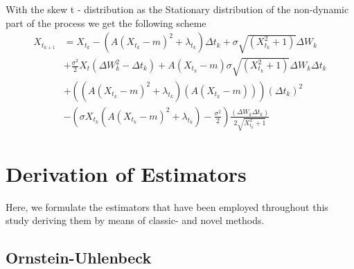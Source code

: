 With the skew t - distribution as the Stationary distribution of the non-dynamic part of the process we get the following scheme
\begin{align}
    X_{t_{k + 1}} &= X_{t_k} - \left(A(X_{t_k} - m)^2 + \lambda_{t_k}\right) \Delta t_k + \sigma \sqrt{\left(X_{t_k}^2 + 1\right)} \Delta W_{k} \nonumber\\
    &+ \frac{\sigma^2}{2}X_t \left(\Delta W_{k}^2 - \Delta t_k\right) + A\left(X_{t_k} - m \right)\sigma\sqrt{\left(X_{t_k}^2 + 1\right)}\Delta W_{k}\Delta t_k \nonumber\\
    &+ \left(\left(A\left(X_{t_k} - m \right)^2+\lambda_{t_k}\right)\left(A\left(X_{t_k} - m \right)\right)\right)\left(\Delta t_k\right)^2 \nonumber\\
    &-\left(\sigma X_{t_k}\left(A\left(X_{t_k} - m \right)^2 + \lambda_{t_k}\right) - \frac{\sigma^2}{2}\right)\frac{\left(\Delta W_{k}\Delta t_k\right)}{2\sqrt{X_{t_k}^2 + 1}}
\end{align}
\section{Derivation of Estimators}
Here, we formulate the estimators that have been employed throughout this study deriving them by means of classic- and novel methods.
\subsection{Ornstein-Uhlenbeck}\label{subsec:OUprocess}
